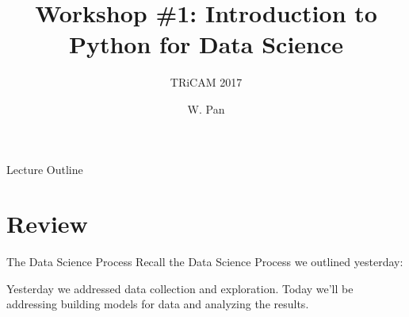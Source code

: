 \documentclass[12pt,t]{beamer}
\begin{document}

\title{\large{Workshop \#1: Introduction to Python for Data Science}}
\subtitle{TRiCAM 2017}
\author{W. Pan}
\date{}
{
\frame{
  \titlepage
  
}
}

\begin{frame}{Lecture Outline}
\tableofcontents
\end{frame}

\section{Review}

\begin{frame}{The Data Science Process} 
Recall the Data Science Process we outlined yesterday:
\vskip0.2cm
\vskip0.2cm
Yesterday we addressed data collection and exploration. Today we'll be addressing building models for data and analyzing the results.
\end{frame}
\end{document}

